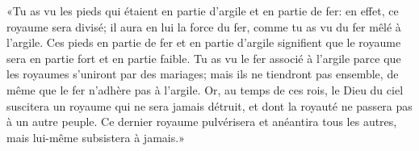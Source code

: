 «Tu as vu les pieds qui étaient en partie d’argile et en partie de fer:
	en effet, ce royaume sera divisé;
	il aura en lui la force du fer, comme tu as vu du fer mêlé à l’argile.
Ces pieds en partie de fer et en partie d’argile
	signifient que le royaume sera en partie fort et en partie faible.
Tu as vu le fer associé à l’argile parce que les royaumes s’uniront par des mariages;
	mais ils ne tiendront pas ensemble, de même que le fer n’adhère pas à l’argile.
Or, au temps de ces rois, le Dieu du ciel suscitera un royaume qui ne sera jamais détruit,
	et dont la royauté ne passera pas à un autre peuple.
Ce dernier royaume pulvérisera et anéantira tous les autres,
	mais lui-même subsistera à jamais.»
